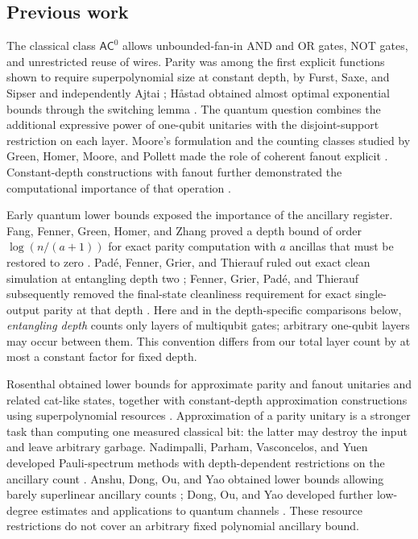 \subsection{Previous work}

The classical class $\mathsf{AC}^{0}$ allows unbounded-fan-in AND and
OR gates, NOT gates, and unrestricted reuse of wires. Parity was among
the first explicit functions shown to require superpolynomial size
at constant depth, by Furst, Saxe, and Sipser and independently Ajtai
\citep{FurstSaxeSipser1984,Ajtai1983}; H\aa stad obtained almost optimal
exponential bounds through the switching lemma \citep{Hastad1986}.
The quantum question combines the additional expressive power of
one-qubit unitaries with the disjoint-support restriction on each layer.
Moore's formulation and the counting classes studied by Green, Homer,
Moore, and Pollett made the role of coherent fanout explicit
\citep{Moore1999,GreenHomerMoorePollett2002}. Constant-depth
constructions with fanout further demonstrated the computational
importance of that operation \citep{HoyerSpalek2005}.

Early quantum lower bounds exposed the importance of the ancillary
register. Fang, Fenner, Green, Homer, and Zhang proved a depth bound of
order $\log(n/(a+1))$ for exact parity computation with $a$ ancillas
that must be restored to zero
\citep[Corollary~4.6]{FangFennerGreenHomerZhang2006}.
Pad\'e, Fenner, Grier, and Thierauf ruled out exact clean simulation
at entangling depth two \citep{PadeFennerGrierThierauf2020}; Fenner,
Grier, Pad\'e, and Thierauf subsequently removed the final-state
cleanliness requirement for exact single-output parity at that depth
\citep[Theorem~6.1]{FennerGrierPadeThierauf2025}.
Here and in the depth-specific comparisons below, \emph{entangling
depth} counts only layers of multiqubit gates; arbitrary one-qubit
layers may occur between them. This convention differs from our total
layer count by at most a constant factor for fixed depth.

Rosenthal obtained lower bounds for approximate parity and fanout
unitaries and related cat-like states, together with constant-depth
approximation constructions using superpolynomial resources
\citep{Rosenthal2021}. Approximation of a parity unitary is a stronger
task than computing one measured classical bit: the latter may destroy
the input and leave arbitrary garbage. Nadimpalli, Parham, Vasconcelos,
and Yuen developed Pauli-spectrum methods with depth-dependent
restrictions on the ancillary count
\citep{NadimpalliParhamVasconcelosYuen2024}. Anshu, Dong, Ou, and Yao
obtained lower bounds allowing barely superlinear ancillary counts
\citep{AnshuDongOuYao2025}; Dong, Ou, and Yao developed further
low-degree estimates and applications to quantum channels
\citep{DongOuYao2025}. These resource restrictions do not cover an
arbitrary fixed polynomial ancillary bound.

